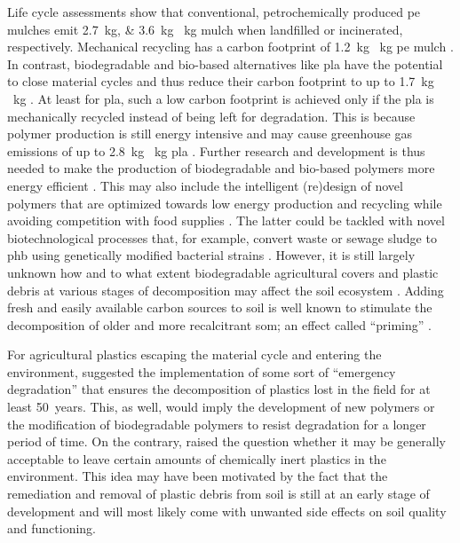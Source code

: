 Life cycle assessments show that conventional, petrochemically produced \ac{pe} mulches emit \SIlist{2.7;3.6}{\kilo\gram}\,\,\si{\per\kilo\gram} mulch when landfilled or incinerated, respectively. Mechanical recycling has a carbon footprint of \SI{1.2}{\kilo\gram}  \si{\per\kilo\gram} \ac{pe} mulch \citep{BosLife2008}. In contrast, biodegradable and bio-based alternatives like \ac{pla} have the potential to close material cycles and thus reduce their carbon footprint to up to \SI{1.7}{\kilo\gram}\,\,\si{\per\kilo\gram} \citep{KollerSwitching2019,RezvaniGhomiLife2021}. At least for \ac{pla}, such a low carbon footprint is achieved only if the \ac{pla} is mechanically recycled instead of being left for degradation. This is because polymer production is still energy intensive and may cause greenhouse gas emissions of up to \SI{2.8}{\kilo\gram}\,\,\si{\per\kilo\gram} \ac{pla} \citep{RezvaniGhomiLife2021,AltmanMyth2021}. Further research and development is thus needed to make the production of biodegradable and bio-based polymers more energy efficient \citep{VieraAre2021}. This may also include the intelligent (re)design of novel polymers that are optimized towards low energy production and recycling \citep{VieraAre2021,KorleyPolymer2021,KakadellisAchieving2021} while avoiding competition with food supplies \citep{RhodesPlastic2018}. The latter could be tackled with novel biotechnological processes that, for example, convert waste or sewage sludge to \ac{phb} using genetically modified bacterial strains \citep{LeongWaste2021}.
However, it is still largely unknown how and to what extent biodegradable agricultural covers and plastic debris at various stages of decomposition may affect the soil ecosystem \citep{SanderBiodegradation2019,QinReview2021,AltmanMyth2021}. Adding fresh and easily available carbon sources to soil is well known to stimulate the decomposition of older and more recalcitrant \ac{som}; an effect called ``priming'' \citep{ChenMixing2020}.

For agricultural plastics escaping the material cycle and entering the environment, \citet{WeiPossibilities2020,BertlingKunststoffe2021} suggested the implementation of some sort of ``emergency degradation'' that ensures the decomposition of plastics lost in the field for at least \SI{50}{years}. This, as well, would imply the development of new polymers or the modification of biodegradable polymers to resist degradation for a longer period of time. On the contrary, \citet{ScalengheResource2018} raised the question whether it may be generally acceptable to leave certain amounts of chemically inert plastics in the environment. This idea may have been motivated by the fact that the remediation and removal of plastic debris from soil is still at an early stage of development \citep{PadervandRemoval2020} and will most likely come with unwanted side effects on soil quality and functioning.

